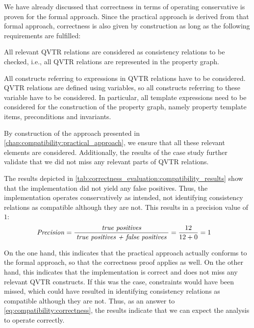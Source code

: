 We have already discussed that correctness in terms of operating conservative is proven for the formal approach.
Since the practical approach is derived from that formal approach, correctness is also given by construction as long as the following requirements are fulfilled:
\begin{longenumerate}
    \item All relevant \gls{QVTR} relations are considered as consistency relations to be checked, i.e., all \gls{QVTR} relations are represented in the property graph.
    \item All constructs referring to expressions in \gls{QVTR} relations have to be considered. \gls{QVTR} relations are defined using variables, so all constructs referring to these variable have to be considered. In particular, all template expressions need to be considered for the construction of the property graph, namely property template items, preconditions and invariants.
\end{longenumerate}
By construction of the approach presented in \autoref{chap:compatibility:practical_approach}, we ensure that all these relevant elements are considered.
Additionally, the results of the case study further validate that we did not miss any relevant parts of \gls{QVTR} relations.

The results depicted in \autoref{tab:correctness_evaluation:compatibility_results} show that the implementation did not yield any false positives.
Thus, the implementation operates conservatively as intended, not identifying consistency relations as compatible although they are not.
This results in a precision value of $1$:
\begin{align*}
    &
    \mathit{Precision} = \frac{\; \textit{true positives} \;}{\; \textit{true positives + false positives} \;} = \frac{12}{12+0} = 1
\end{align*}

On the one hand, this indicates that the practical approach actually conforms to the formal approach, so that the correctness proof applies as well.
On the other hand, this indicates that the implementation is correct and does not miss any relevant \gls{QVTR} constructs.
If this was the case, constraints would have been missed, which could have resulted in identifying consistency relations as compatible although they are not.
Thus, as an answer to \autoref{eq:compatibility:correctness}, the results indicate that we can expect the analysis to operate correctly.


